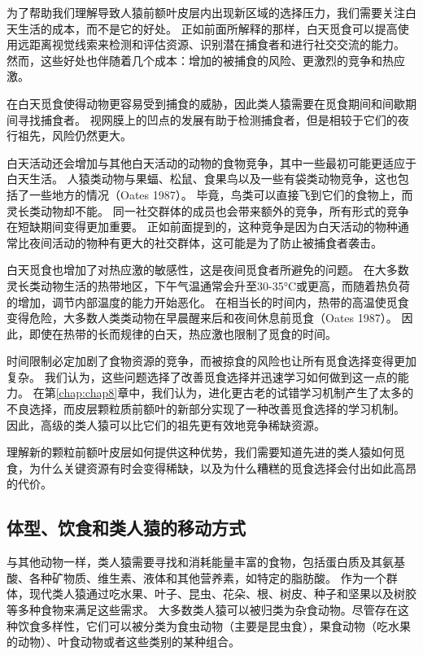 为了帮助我们理解导致人猿前额叶皮层内出现新区域的选择压力，我们需要关注白天生活的成本，而不是它的好处。
正如前面所解释的那样，白天觅食可以提高使用远距离视觉线索来检测和评估资源、识别潜在捕食者和进行社交交流的能力。
然而，这些好处也伴随着几个成本：增加的被捕食的风险、更激烈的竞争和热应激。


在白天觅食使得动物更容易受到捕食的威胁，因此类人猿需要在觅食期间和间歇期间寻找捕食者。
视网膜上的凹点的发展有助于检测捕食者，但是相较于它们的夜行祖先，风险仍然更大。


白天活动还会增加与其他白天活动的动物的食物竞争，其中一些最初可能更适应于白天生活。
人猿类动物与果蝠、松鼠、食果鸟以及一些有袋类动物竞争，这也包括了一些地方的情况（Oates 1987）。
毕竟，鸟类可以直接飞到它们的食物上，而灵长类动物却不能。
同一社交群体的成员也会带来额外的竞争，所有形式的竞争在短缺期间变得更加重要。
正如前面提到的，这种竞争是因为白天活动的物种通常比夜间活动的物种有更大的社交群体，这可能是为了防止被捕食者袭击。


白天觅食也增加了对热应激的敏感性，这是夜间觅食者所避免的问题。
在大多数灵长类动物生活的热带地区，下午气温通常会升至30-35°C或更高，而随着热负荷的增加，调节内部温度的能力开始恶化。
在相当长的时间内，热带的高温使觅食变得危险，大多数人类类动物在早晨醒来后和夜间休息前觅食（Oates 1987）。
因此，即使在热带的长而规律的白天，热应激也限制了觅食的时间。


时间限制必定加剧了食物资源的竞争，而被掠食的风险也让所有觅食选择变得更加复杂。
我们认为，这些问题选择了改善觅食选择并迅速学习如何做到这一点的能力。
在第\ref{chap:chap8}章中，我们认为，进化更古老的试错学习机制产生了太多的不良选择，而皮层颗粒质前额叶的新部分实现了一种改善觅食选择的学习机制。
因此，高级的类人猿可以比它们的祖先更有效地竞争稀缺资源。


理解新的颗粒前额叶皮层如何提供这种优势，我们需要知道先进的类人猿如何觅食，为什么关键资源有时会变得稀缺，以及为什么糟糕的觅食选择会付出如此高昂的代价。



\subsection{体型、饮食和类人猿的移动方式}

与其他动物一样，类人猿需要寻找和消耗能量丰富的食物，包括蛋白质及其氨基酸、各种矿物质、维生素、液体和其他营养素，如特定的脂肪酸。
作为一个群体，现代类人猿通过吃水果、叶子、昆虫、花朵、根、树皮、种子和坚果以及树胶等多种食物来满足这些需求。
大多数类人猿可以被归类为杂食动物。尽管存在这种饮食多样性，它们可以被分类为食虫动物（主要是昆虫食），果食动物（吃水果的动物）、叶食动物或者这些类别的某种组合。



